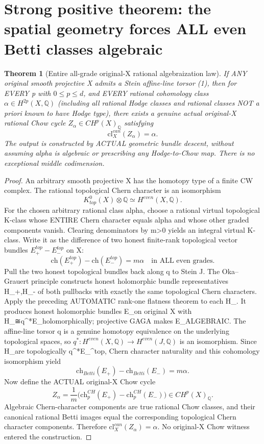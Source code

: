 \documentclass[11pt]{article}
\newtheorem{theorem}{Theorem}
\begin{document}
\section{Strong positive theorem: the spatial geometry forces ALL even Betti classes algebraic}
\begin{theorem}[Entire all-grade original-X rational algebraization law]
If ANY original smooth projective X admits a Stein affine-line
torsor (1), then for EVERY p with $0\le p\le d$, and EVERY
rational cohomology class $\alpha\in H^{2p}(X,\mathbb Q)$
(including all rational Hodge classes and rational classes NOT
a priori known to have Hodge type),
there exists a genuine actual original-X rational Chow cycle
$Z_\alpha\in CH^p(X)_{\mathbb Q}$ satisfying
\[
 \boxed{\mathrm{cl}^{can}_X(Z_\alpha)=\alpha.}        \tag{4}
\]
The output is constructed by ACTUAL geometric bundle descent,
without assuming alpha is algebraic or prescribing any
Hodge-to-Chow map. There is no exceptional middle codimension.
\end{theorem}
\begin{proof}
An arbitrary smooth projective X has the homotopy type of a
finite CW complex. The rational topological Chern character is
an isomorphism
\[
 K^0_{top}(X)\otimes\mathbb Q
        \simeq H^{even}(X,\mathbb Q).
\]
For the chosen arbitrary rational class alpha, choose a rational
virtual topological K-class whose ENTIRE Chern character equals
alpha and whose other graded components vanish. Clearing
denominators by m>0 yields an integral virtual K-class.
Write it as the difference of two honest finite-rank
topological vector bundles $E_+^{top}-E_-^{top}$ on X:
\[
 \boxed{\mathrm{ch}(E_+^{top})-\mathrm{ch}(E_-^{top})
                       =m\alpha\quad\text{in ALL even grades}.}
 \tag{5}
\]
Pull the two honest topological bundles back along q to Stein
J. The Oka--Grauert principle constructs honest
holomorphic bundle representatives H_+,H_- of both
pullbacks with exactly the same topological Chern characters.
Apply the preceding AUTOMATIC rank-one flatness theorem
to each H_\pm. It produces honest holomorphic bundles
E_\pm on original X with H_\pm≅q^*E_\pm holomorphically;
projective GAGA makes E_\pm ALGEBRAIC.
The affine-line torsor q is a genuine homotopy equivalence
on the underlying topological spaces, so
$q^*:H^{even}(X,\mathbb Q)\to H^{even}(J,\mathbb Q)$
is an isomorphism. Since H_\pm are topologically q^*E_\pm^{top},
Chern character naturality and this cohomology isomorphism yield
\[
 \mathrm{ch}_{Betti}(E_+)-\mathrm{ch}_{Betti}(E_-)=m\alpha.
\]
Now define the ACTUAL original-X Chow cycle
\[
 \boxed{
 Z_\alpha=\frac{1}{m}
   \bigl(\mathrm{ch}^{CH}_p(E_+)-\mathrm{ch}^{CH}_p(E_-)\bigr)
        \in CH^p(X)_{\mathbb Q}.
 }                                                        \tag{6}
\]
Algebraic Chern-character components are true rational Chow
classes, and their canonical rational Betti images equal
the corresponding topological Chern character components.
Therefore $\mathrm{cl}_X^{can}(Z_\alpha)=\alpha$.
No original-X Chow witness entered the construction.
\end{proof}
\end{document}
